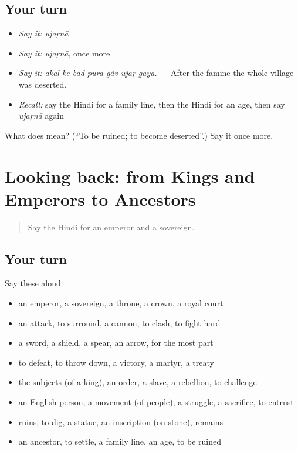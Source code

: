 \subsection*{Your turn}
\begin{itemize}
\raggedright
  \item \emph{Say it:} \emph{ujaṛnā}
  \item \emph{Say it:} \emph{ujaṛnā}, once more
  \item \emph{Say it:} \emph{akāl ke bād pūrā gā̃v ujaṛ gayā.} — After the famine the whole village was deserted.
  \item \emph{Recall:} say the Hindi for a family line, then the Hindi for an age, then say \emph{ujaṛnā} again
\end{itemize}

\begin{tcolorbox}[breakable,colback=teal!4,colframe=teal!35!black,title={Before you move on}]
What does  mean? (\textquotedblleft{}To be ruined; to become deserted\textquotedblright{}.) Say it once more.
\end{tcolorbox}
\section[(dialogue)]{Looking back: from Kings and Emperors to Ancestors}

\label{lesson:HI-R327-review-320-327}



\begin{quote}
Say the Hindi for an emperor and a sovereign.
\end{quote}

\subsection*{Your turn}
Say these aloud:

\begin{itemize}
\raggedright
  \item an emperor, a sovereign, a throne, a crown, a royal court
  \item an attack, to surround, a cannon, to clash, to fight hard
  \item a sword, a shield, a spear, an arrow, for the most part
  \item to defeat, to throw down, a victory, a martyr, a treaty
  \item the subjects (of a king), an order, a slave, a rebellion, to challenge
  \item an English person, a movement (of people), a struggle, a sacrifice, to entrust
  \item ruins, to dig, a statue, an inscription (on stone), remains
  \item an ancestor, to settle, a family line, an age, to be ruined
\end{itemize}

